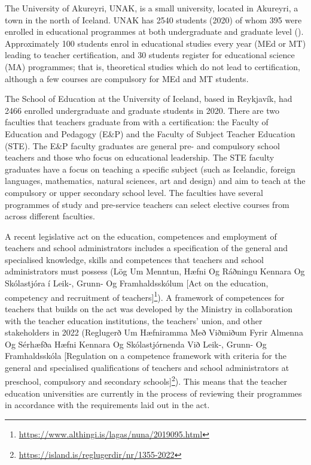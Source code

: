 \documentclass[output=paper]{langscibook}
\begin{document}
The University of Akureyri, UNAK, is a small university, located in Akureyri, a town in the north of Iceland. UNAK has 2540 students (2020) of whom 395 were enrolled in educational programmes at both undergraduate and graduate level (\citealt{Unak2020-1}). Approximately 100 students enrol in educational studies every year (MEd or MT) leading to teacher certification, and 30 students register for educational science (MA) programmes; that is, theoretical studies which do not lead to certification, although a few courses are compulsory for MEd and MT students.

The School of Education at the University of Iceland, based in Reykjavík, had 2466 enrolled undergraduate and graduate students in 2020. There are two faculties that teachers graduate from with a certification: the Faculty of Education and Pedagogy (E\&P) and the Faculty of Subject Teacher Education (STE). The E\&P faculty graduates are general pre- and compulsory school teachers and those who focus on educational leadership. The STE faculty graduates have a focus on teaching a specific subject (such as Icelandic, foreign languages, mathematics, natural sciences, art and design) and aim to teach at the compulsory or upper secondary school level. The faculties have several programmes of study and pre-service teachers can select elective courses from across different faculties.

A recent legislative act on the education, competences and employment of teachers and school administrators includes a specification of the general and specialised knowledge, skills and competences that teachers and school administrators must possess (Lög Um Menntun, Hæfni Og Ráðningu Kennara Og Skólastjóra í Leik-, Grunn- Og Framhaldsskólum [Act on the education, competency {and} recruitment of teachers]\footnote{\url{https://www.althingi.is/lagas/nuna/2019095.html}}). A framework of competences for teachers that builds on the act was developed by the Ministry in collaboration with the teacher education institutions, the teachers’ union, and other stakeholders in 2022 (Reglugerð Um Hæfniramma Með Viðmiðum Fyrir Almenna Og Sérhæfða Hæfni Kennara Og Skólastjórnenda Við Leik-, Grunn- Og Framhaldsskóla [Regulation on a competence framework with criteria for the general {and} specialised qualifications of teachers {and} school administrators at preschool, compulsory {and} secondary schools]\footnote{\url{https://island.is/reglugerdir/nr/1355-2022}}). This means that the teacher education universities are currently in the process of reviewing their programmes in accordance with the requirements laid out in the act.
\end{document}
